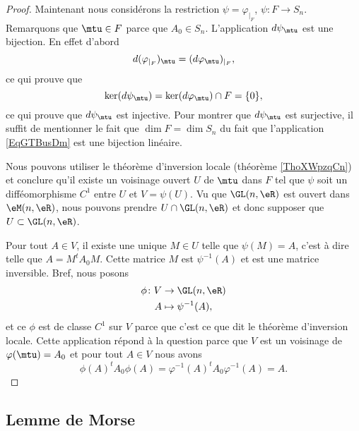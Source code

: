 \begin{proof}
    Maintenant nous considérons la restriction \( \psi=\varphi_{|_F}\), \( \psi\colon F\to S_n\). Remarquons que \( \mtu\in F\) parce que \( A_0\in S_n\). L'application \( d\psi_{\mtu}\) est une bijection. En effet d'abord
    \begin{equation}
        d(\varphi_{|_F})_{\mtu}=(d\varphi_{\mtu})_{|_F},
    \end{equation}
    ce qui prouve que
    \begin{equation}
        \ker(d\psi_{\mtu})=\ker(d\varphi_{\mtu})\cap F=\{ 0 \},
    \end{equation}
    ce qui prouve que \( d\psi_{\mtu}\) est injective. Pour montrer que \( d\psi_{\mtu}\) est surjective, il suffit de mentionner le fait que \( \dim F=\dim S_n\) du fait que l'application \eqref{EqGTBusDm} est une bijection linéaire.

    Nous pouvons utiliser le théorème d'inversion locale (théorème \ref{ThoXWpzqCn}) et conclure qu'il existe un voisinage ouvert \( U\) de \( \mtu\) dans \( F\) tel que \( \psi\) soit un difféomorphisme \( C^1\) entre \( U\) et \( V=\psi(U)\). Vu que \( \GL(n,\eR)\) est ouvert dans \( \eM(n,\eR)\), nous pouvons prendre \( U\cap \GL(n,\eR)\) et donc supposer que \( U\subset \GL(n,\eR)\).

    Pour tout \( A\in V\), il existe une unique \( M\in U\) telle que \( \psi(M)=A\), c'est à dire telle que \( A=M^tA_0M\). Cette matrice \( M\) est \( \psi^{-1}(A)\) et est une matrice inversible. Bref, nous posons
    \begin{equation}
        \begin{aligned}
            \phi\colon V&\to \GL(n,\eR) \\
            A&\mapsto \psi^{-1}(A), 
        \end{aligned}
    \end{equation}
    et ce \( \phi\) est de classe \( C^1\) sur \( V\) parce que c'est ce que dit le théorème d'inversion locale. Cette application répond à la question parce que \( V\) est un voisinage de \( \varphi(\mtu)=A_0\) et pour tout \( A\in V\) nous avons
    \begin{equation}
        \phi(A)^tA_0\phi(A)=\varphi^{-1}(A)^tA_0\varphi^{-1}(A)=A.
    \end{equation}
\end{proof}

\subsection{Lemme de Morse}

